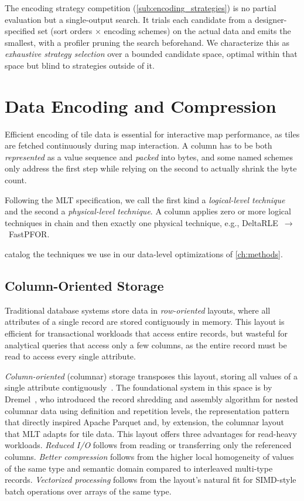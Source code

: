 The encoding strategy competition (\cref{sub:encoding_strategies}) is no partial evaluation but a single-output search.
It trials each candidate from a designer-specified set (sort orders $\times$ encoding schemes) on the actual data and emits the smallest, with a profiler pruning the search beforehand.
We characterize this as \emph{exhaustive strategy selection} over a bounded candidate space, optimal within that space but blind to strategies outside of it.

\section{Data Encoding and Compression}\label{sec:data_encoding}

Efficient encoding of tile data is essential for interactive map performance, as tiles are fetched continuously during map interaction.
A column has to be both \emph{represented} as a value sequence and \emph{packed} into bytes, and some named schemes only address the first step while relying on the second to actually shrink the byte count.

Following the MLT specification, we call the first kind a \emph{logical-level technique} and the second a \emph{physical-level technique}.
A column applies zero or more logical techniques in chain and then exactly one physical technique, e.g., DeltaRLE~$\rightarrow$~FastPFOR.

 catalog the techniques we use in our data-level optimizations of \cref{ch:methods}.

\subsection{Column-Oriented Storage}\label{sub:column_storage}

Traditional database systems store data in \emph{row-oriented} layouts, where all attributes of a single record are stored contiguously in memory.
This layout is efficient for transactional workloads that access entire records, but wasteful for analytical queries that access only a few columns, as the entire record must be read to access every single attribute.

\emph{Column-oriented} (columnar) storage transposes this layout, storing all values of a single attribute contiguously~\cite{abadiDesignImplementationModern2013}.
The foundational system in this space is by Dremel~\cite{melnikDremelInteractiveAnalysis2010}, who introduced the record shredding and assembly algorithm for nested columnar data using definition and repetition levels, the representation pattern that directly inspired Apache Parquet and, by extension, the columnar layout that \ac{MLT} adapts for tile data.
This layout offers three advantages for read-heavy workloads. \emph{Reduced I/O} follows from reading or transferring only the referenced columns. \emph{Better compression} follows from the higher local homogeneity of values of the same type and semantic domain compared to interleaved multi-type records. \emph{Vectorized processing} follows from the layout's natural fit for \ac{SIMD}-style batch operations over arrays of the same type.

